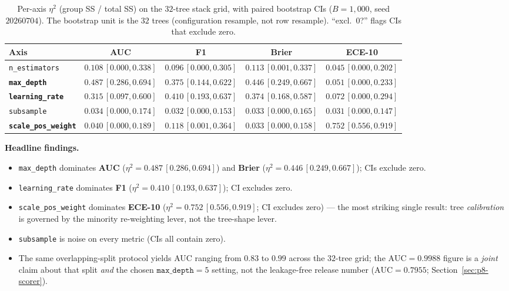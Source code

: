 \documentclass{article}
\providecommand{\secref}[1]{Section~\ref{#1}}
\begin{document}
\begin{table}[t]
\centering\small
\caption{Per-axis $\eta^2$ (group SS / total SS) on the $32$-tree
stack grid, with paired bootstrap CIs ($B{=}1{,}000$, seed $20260704$).
The bootstrap unit is the $32$ trees (configuration resample, not row
resample). ``excl.\ 0?'' flags CIs that exclude zero.}
\label{tab:p8-stack-eta2}
\begin{tabular}{lcccc}
\toprule
Axis & AUC & F1 & Brier & ECE-10 \\
\midrule
\texttt{n\_estimators}     & $0.108\,[0.000,0.338]$ & $0.096\,[0.000,0.305]$ & $0.113\,[0.001,0.337]$ & $0.045\,[0.000,0.202]$ \\
\textbf{\texttt{max\_depth}}       & $\mathbf{0.487\,[0.286,0.694]}$ & $\mathbf{0.375\,[0.144,0.622]}$ & $\mathbf{0.446\,[0.249,0.667]}$ & $0.051\,[0.000,0.233]$ \\
\textbf{\texttt{learning\_rate}}   & $\mathbf{0.315\,[0.097,0.600]}$ & $\mathbf{0.410\,[0.193,0.637]}$ & $\mathbf{0.374\,[0.168,0.587]}$ & $0.072\,[0.000,0.294]$ \\
\texttt{subsample}         & $0.034\,[0.000,0.174]$ & $0.032\,[0.000,0.153]$ & $0.033\,[0.000,0.165]$ & $0.031\,[0.000,0.147]$ \\
\textbf{\texttt{scale\_pos\_weight}} & $0.040\,[0.000,0.189]$ & $\mathbf{0.118\,[0.001,0.364]}$ & $0.033\,[0.000,0.158]$ & $\mathbf{0.752\,[0.556,0.919]}$ \\
\bottomrule
\end{tabular}
\end{table}

\textbf{Headline findings.}
\begin{itemize}
\item \texttt{max\_depth} dominates \textbf{AUC} ($\eta^2{=}0.487\,[0.286,0.694]$)
  and \textbf{Brier} ($\eta^2{=}0.446\,[0.249,0.667]$); CIs exclude zero.
\item \texttt{learning\_rate} dominates \textbf{F1} ($\eta^2{=}0.410\,[0.193,0.637]$);
  CI excludes zero.
\item \texttt{scale\_pos\_weight} dominates \textbf{ECE-10}
  ($\eta^2{=}0.752\,[0.556,0.919]$; CI excludes zero) — the most striking
  single result: tree \emph{calibration} is governed by the minority
  re-weighting lever, not the tree-shape lever.
\item \texttt{subsample} is noise on every metric (CIs all contain zero).
\item The same overlapping-split protocol yields AUC ranging from $0.83$
  to $0.99$ across the $32$-tree grid; the $\mathrm{AUC}{=}0.9988$ figure
  is a \emph{joint} claim about that split \emph{and} the chosen
  $\texttt{max\_depth}{=}5$ setting, not the leakage-free release number
  ($\mathrm{AUC}{=}0.7955$; \secref{sec:p8-scorer}).
\end{itemize}
\end{document}
